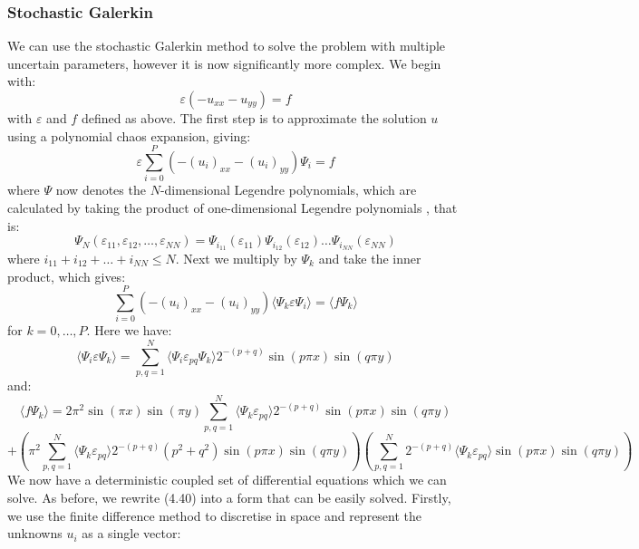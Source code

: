 \documentclass[11pt]{article}
\numberwithin{equation}{section}
\begin{document}
\subsubsection{Stochastic Galerkin}
We can use the stochastic Galerkin method to solve the problem with multiple uncertain parameters, however it is now significantly more complex. We begin with:
\begin{equation}
\varepsilon(-u_{xx} - u_{yy}) = f
\end{equation}
with $\varepsilon$ and $f$ defined as above. The first step is to approximate the solution $u$ using a polynomial chaos expansion, giving:
\begin{equation}
\varepsilon \sum_{i=0}^P (-(u_i)_{xx} - (u_i)_{yy}) \Psi_i = f
\end{equation}
where $\Psi$ now denotes the $N$-dimensional Legendre polynomials, which are calculated by taking the product of one-dimensional Legendre polynomials \cite{Paul}, that is:
\begin{equation}
\Psi_N (\varepsilon_{11}, \varepsilon_{12}, \dots, \varepsilon_{NN}) = \Psi_{i_{11}} (\varepsilon_{11})  \Psi_{i_{12}} (\varepsilon_{12}) \dots \Psi_{i_{NN}} (\varepsilon_{NN})  
\end{equation}
where $i_{11} + i_{12} + \dots + i_{NN} \leq N$. Next we multiply by $\Psi_k$ and take the inner product, which gives:
\begin{equation}
\sum_{i=0}^P (-(u_i)_{xx} - (u_i)_{yy}) \langle \Psi_k \varepsilon \Psi_i \rangle = \langle f \Psi_k \rangle
\end{equation}
for $k=0,\dots,P$. Here we have:
\begin{equation}
\langle \Psi_i \varepsilon \Psi_k \rangle = \sum_{p,q=1}^N \langle \Psi_i \varepsilon_{pq} \Psi_k \rangle 2^{-(p+q)} \sin(p\pi x)\sin(q\pi y) 
\end{equation}
and:
\begin{equation}
\langle f \Psi_k \rangle = 2 \pi^2 \sin(\pi x)\sin(\pi y) \sum_{p,q=1}^N \langle \Psi_k \varepsilon_{pq} \rangle 2^{-(p+q)} \sin(p \pi x) \sin(q \pi y)  \nonumber
\end{equation}
\begin{equation}
+ \left(\pi^2 \sum_{p,q=1}^N \langle \Psi_k \varepsilon_{pq} \rangle 2^{-(p+q)} (p^2 + q^2) \sin(p \pi x)\sin(q \pi y) \right) \left(\sum_{p,q=1}^N 2^{-(p+q)} \langle \Psi_k \varepsilon_{pq} \rangle \sin(p \pi x)\sin(q \pi y) \right)
\end{equation}
We now have a deterministic coupled set of differential equations which we can solve. As before, we rewrite (4.40) into a form that can be easily solved. Firstly, we use the finite difference method to discretise in space and represent the unknowns $u_i$ as a single vector:
\end{document}
